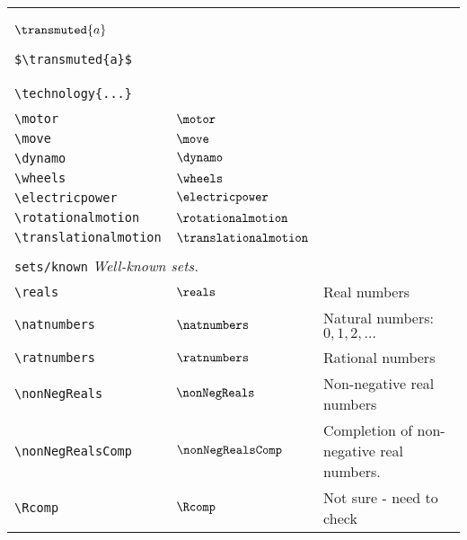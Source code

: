 \begin{longtable}{lll}
{{\begin{minipage}[]{5cm}
$\transmuted{a}$\par%
{\footnotesize{\texttt{\$\textbackslash transmuted\{a\}\$}}}\end{minipage}%
}%
}%
\\ 
 {\color[rgb]{0.5,0.5,0.5}\texttt{\textbackslash technology\{...\}}} &  & \\ 
  &  & {\setlength\fboxsep{1pt}%
\fbox{%
\color[rgb]{0.5,0.5,0.5}\begin{minipage}[]{5cm}%
$\technology{a}$\par%
{\footnotesize{\texttt{\$\textbackslash technology\{a\}\$}}}\end{minipage}%
}%
}%
\\ 
 {\color[rgb]{0.5,0.5,0.5}\texttt{\textbackslash motor}} & $\motor$ & \\ 
 {\color[rgb]{0.5,0.5,0.5}\texttt{\textbackslash move}} & $\move$ & \\ 
 {\color[rgb]{0.5,0.5,0.5}\texttt{\textbackslash dynamo}} & $\dynamo$ & \\ 
 {\color[rgb]{0.5,0.5,0.5}\texttt{\textbackslash wheels}} & $\wheels$ & \\ 
 {\color[rgb]{0.5,0.5,0.5}\texttt{\textbackslash electricpower}} & $\electricpower$ & \\ 
 {\color[rgb]{0.5,0.5,0.5}\texttt{\textbackslash rotationalmotion}} & $\rotationalmotion$ & \\ 
 {\color[rgb]{0.5,0.5,0.5}\texttt{\textbackslash translationalmotion}} & $\translationalmotion$ & \\ 
  &  & \\ 
 \multicolumn{3}{l}{{\color[rgb]{0.5,0.5,0.5}\texttt{sets/known}} \emph{Well-known sets.}}\\ 
 \hline
{\color[rgb]{0.5,0.5,0.5}\texttt{\textbackslash reals}} & $\reals$ &  Real numbers\\ 
 {\color[rgb]{0.5,0.5,0.5}\texttt{\textbackslash natnumbers}} & $\natnumbers$ &  Natural numbers: $0, 1, 2, \dots$\\ 
 {\color[rgb]{0.5,0.5,0.5}\texttt{\textbackslash ratnumbers}} & $\ratnumbers$ &  Rational numbers\\ 
 {\color[rgb]{0.5,0.5,0.5}\texttt{\textbackslash nonNegReals}} & $\nonNegReals$ &  Non-negative real numbers\\ 
 {\color[rgb]{0.5,0.5,0.5}\texttt{\textbackslash nonNegRealsComp}} & $\nonNegRealsComp$ &  Completion of non-negative real numbers.\\ 
 {\color[rgb]{0.5,0.5,0.5}\texttt{\textbackslash Rcomp}} & $\Rcomp$ &  Not sure - need to check\\ 

\end{longtable}
